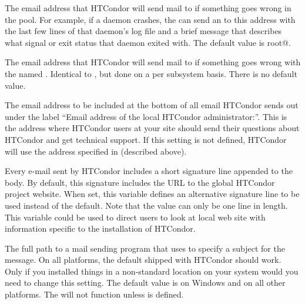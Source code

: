 \begin{description}
\label{param:CondorAdmin}
\item[\Macro{CONDOR\_ADMIN}]
  The email address that HTCondor will send mail to if something goes wrong in
  the pool.  For example, if a daemon crashes, the 
  can send an  to this address with the last few lines
  of that daemon's log file and a brief message that describes what
  signal or exit status that daemon exited with.
  The default value is root@.

\label{param:SubsysAdminEmail}
\item[\MacroB{<SUBSYS>\_ADMIN\_EMAIL}]
  The email address that HTCondor will send mail to if something goes wrong
  with the named .  Identical to ,
  but done on a per subsystem basis. There is no default value.
  
\label{param:CondorSupportEmail}
\item[\Macro{CONDOR\_SUPPORT\_EMAIL}]
  The email address to be included at the bottom of all email HTCondor
  sends out under the label ``Email address of the local HTCondor
  administrator:''.  
  This is the address where HTCondor users at your site should send
  their questions about HTCondor and get technical support.
  If this setting is not defined, HTCondor will use the address
  specified in  (described above).

\label{param:EmailSignature}
\item[\Macro{EMAIL\_SIGNATURE}]
  Every e-mail sent by HTCondor includes a short signature line appended
  to the body.  By default, this signature includes the URL to the
  global HTCondor project website.  
  When set, this variable defines an alternative signature line to be
  used instead of the default. 
  Note that the value can only be one line in length.
  This variable could be used to direct users
  to look at local web site with information specific to the installation
  of HTCondor.

\label{param:Mail}
\item[\Macro{MAIL}]
  The full path to a mail
  sending program that uses  to specify a subject for the
  message.  On all platforms, the default shipped with HTCondor should
  work.  Only if you installed things in a non-standard location on
  your system would you need to change this setting.
  The default value is  on Windows
  and  on all other platforms.
  The  will not
  function unless  is defined.


\end{description}
